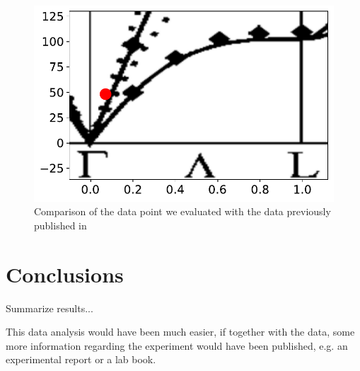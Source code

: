 \documentclass[aps,prx,reprint,amsmath,amssymb,superscriptaddress,showpacs]{revtex4-1}
\begin{document}
\begin{figure}
    \includegraphics[width=1.0\linewidth]{dispersion.pdf}
    \caption{Comparison of the data point we evaluated with the data previously published in \cite{Aouissi} }
    \label{fig2}
\end{figure}



\section{Conclusions}

Summarize results...

This data analysis would have been much easier, if together with the data, some more information regarding the experiment would have been published, e.g. an experimental report or a lab book.



\end{document}
